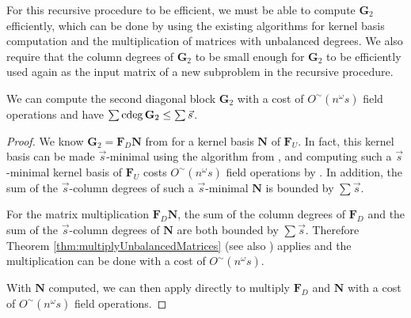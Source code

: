 For this recursive procedure to be efficient, we must be able to compute
$\mathbf{G}_{2}$ efficiently, which can be done by using the existing
algorithms for kernel basis computation and the multiplication of
matrices with unbalanced degrees. We also require that the column
degrees of $\mathbf{G}_{2}$ to be small enough for $\mathbf{G}_{2}$
to be efficiently used again as the input matrix of a new subproblem
in the recursive procedure.
\begin{lem}
\label{lem:secondDiagonalBlock}We can compute the second diagonal
block $\mathbf{G}_{2}$ with a cost of $O^{\sim}\left(n^{\omega}s\right)$
field operations and have $\sum{\rm cdeg}\,\mathbf{G}_{2}\le\sum\vec{s}$.\end{lem}
\begin{proof}
We know $\mathbf{G}_{2}=\mathbf{F}_{D}\mathbf{N}$ from 
for a kernel basis $\mathbf{N}$ of $\mathbf{F}_{U}$. In fact, this
kernel basis can be made $\vec{s}$-minimal using the algorithm from
\citet{za2012}, and computing such a $\vec{s}$-minimal kernel basis
of $\mathbf{F}_{U}$ costs $O^{\sim}\left(n^{\omega}s\right)$ field
operations by . In addition, the sum of
the $\vec{s}$-column degrees of such a $\vec{s}$-minimal $\mathbf{N}$
is bounded by $\sum\vec{s}$.

For the matrix multiplication $\mathbf{F}_{D}\mathbf{N}$, the sum
of the column degrees of $\mathbf{F}_{D}$ and the sum of the $\vec{s}$-column
degrees of $\mathbf{N}$ are both bounded by $\sum\vec{s}$. Therefore
Theorem \ref{thm:multiplyUnbalancedMatrices} (see also \citep[Theorem 3.7]{za2012})
applies and the multiplication can be done with a cost of $O^{\sim}\left(n^{\omega}s\right)$.

With $\mathbf{N}$ computed, we can then apply 
directly to multiply $\mathbf{F}_{D}$ and $\mathbf{N}$ with a cost
of $O^{\sim}\left(n^{\omega}s\right)$ field operations. 
\end{proof}

